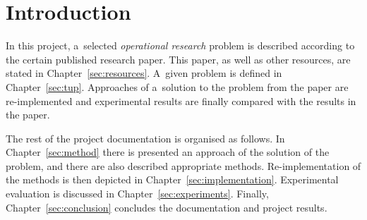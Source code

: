 \documentclass[a4paper, 10pt, twocolumn]{article}
\begin{document}


    \section{Introduction}

    In this project, a~selected \emph{operational research} problem is
    described according to the certain published research paper. This
    paper, as well as other resources, are stated in
    Chapter~\ref{sec:resources}. A~given problem is defined in
    Chapter~\ref{sec:tup}. Approaches of a~solution to the problem from the
    paper are re-implemented and experimental results are finally compared
    with the results in the paper.

    The rest of the project documentation is organised as follows. In
    Chapter~\ref{sec:method} there is presented an approach of the solution
    of the problem, and there are also described appropriate methods.
    Re-implementation of the methods is then depicted in
    Chapter~\ref{sec:implementation}. Experimental evaluation is discussed
    in Chapter~\ref{sec:experiments}. Finally, Chapter~\ref{sec:conclusion}
    concludes the documentation and project results.
\end{document}

